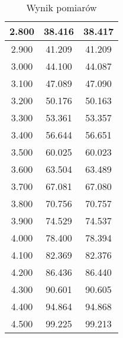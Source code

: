 \documentclass[a4paper,12pt]{article}
\begin{document}
\begin{table}[b]
\begin{tabular}{|c|c|c|}
        \hline
        2.800&	38.416&	38.417\\
        \hline
        2.900&	41.209&	41.209\\
        \hline
        3.000&	44.100&	44.087\\
        \hline
        3.100&	47.089&	47.090\\
        \hline
        3.200&	50.176&	50.163\\
        \hline
        3.300&	53.361&	53.357\\
        \hline
        3.400&	56.644&	56.651\\
        \hline
        3.500&	60.025&	60.023\\
        \hline
        3.600&	63.504&	63.489\\
        \hline
        3.700&	67.081&	67.080\\
        \hline
        3.800&	70.756&	70.757\\
        \hline
        3.900&	74.529&	74.537\\
        \hline
        4.000&	78.400&	78.394\\
        \hline
        4.100&	82.369&	82.376\\
        \hline
        4.200&	86.436&	86.440\\
        \hline
        4.300&	90.601&	90.605\\
        \hline
        4.400&	94.864&	94.868\\
        \hline
        4.500&	99.225&	99.213\\
        \hline
\end{tabular}
\caption{Wynik pomiarów}
\label{tab:my_label1}
\end{table}
\end{document}
